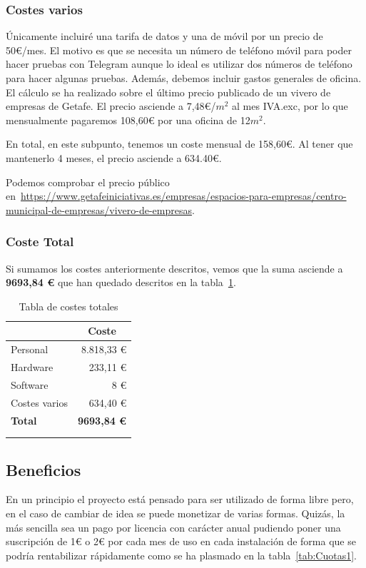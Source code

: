 \subsubsection{Costes varios}
Únicamente incluiré una tarifa de datos y una de móvil por un precio de 50€/mes.
El motivo es que se necesita un número de teléfono móvil para poder hacer pruebas con Telegram aunque lo ideal es utilizar dos números de teléfono para hacer algunas pruebas.
Además, debemos incluir gastos generales de oficina. El cálculo se ha realizado sobre el último precio publicado de un vivero de empresas de Getafe. El precio asciende a 7,48€/$m^{2}$ al mes IVA.exc, por lo que mensualmente pagaremos 108,60€ por una oficina de 12$m^{2}$.

En total, en este subpunto, tenemos un coste mensual de 158,60€. Al tener que mantenerlo 4 meses, el precio asciende a 634.40€.

Podemos comprobar el precio público en~\url{https://www.getafeiniciativas.es/empresas/espacios-para-empresas/centro-municipal-de-empresas/vivero-de-empresas}.

\subsubsection{Coste Total}
Si sumamos los costes anteriormente descritos, vemos que la suma asciende a \textbf{9693,84 €} que han quedado descritos en la tabla~\ref{tab:CosteTotal}.

\begin{longtable}[c]{@{}lr@{}}
\toprule
\centering
\multicolumn{1}{c}{\textbf{Concepto}} & \multicolumn{1}{c}{\textbf{Coste}} \\* \midrule
\endfirsthead
%
\endhead
%
\bottomrule
\endfoot
%
\endlastfoot
%
Personal & 8.818,33 € \\
Hardware & 233,11 € \\
Software & 8 € \\
Costes varios & 634,40 € \\\midrule
\textbf{Total} & \textbf{9693,84 €} \\ \bottomrule \\
\caption{Tabla de costes totales} 
\label{tab:CosteTotal}
\end{longtable}

\subsection{Beneficios}
En un principio el proyecto está pensado para ser utilizado de forma libre pero, en el caso de cambiar de idea se puede monetizar de varias formas. Quizás, la más sencilla sea un pago por licencia con carácter anual pudiendo poner una suscripción de 1€ o 2€ por cada mes de uso en cada instalación de forma que se podría rentabilizar rápidamente como se ha plasmado en la tabla~\ref{tab:Cuotas1}.


